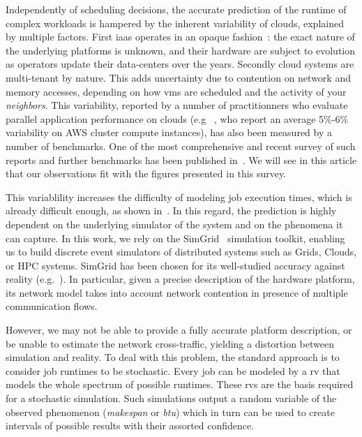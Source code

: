 \documentclass[10pt,conference,compsocconf]{IEEEtran}
\begin{document}
Independently of scheduling decisions, the accurate prediction of the runtime of
complex workloads is  hampered by the inherent variability  of clouds, explained
by multiple factors.  First \ac{iaas} operates  in an opaque fashion~: the exact
nature of the underlying platforms is unknown, and their hardware are subject to
evolution as operators update their data-centers over the years.  Secondly cloud
systems are multi-tenant  by nature. This adds uncertainty due  to contention on
network and  memory accesses, depending  on how  \acp{vm} are scheduled  and the
activity of  your \emph{neighbors}.  This  variability, reported by a  number of
practitionners  who evaluate  parallel  application performance  on clouds  (e.g
~\cite{MehrotraDHHJLSB16},  who report  an  average 5\%-6\%  variability on  AWS
cluster   compute  instances),   has  also   been  measured   by  a   number  of
benchmarks. One of the most comprehensive  and recent survey of such reports and
further benchmarks has been published in~\cite{LeitnerC16}. We will see in this 
article that our observations fit with the figures presented in this survey. 

This  variablility increases  the difficulty  of modeling  job execution  times,
which is  already difficult  enough, as  shown in~\cite{Lastovetsky05}.  In this
regard, the  prediction is highly dependent  on the underlying simulator  of the
system  and on  the phenomena  it can  capture.  In this  work, we  rely on  the
SimGrid~\cite{simgrid} simulation  toolkit, enabling us to  build discrete event
simulators of distributed systems such as Grids, Clouds, or HPC systems. SimGrid
has   been    chosen   for    its   well-studied   accuracy    against   reality
(e.g.~\cite{StanisicTLVM15,VelhoSCL13}).    In  particular,   given  a   precise
description  of the  hardware platform,  its  network model  takes into  account
network contention in presence of multiple communication flows.

However, we may not be able to provide a fully accurate platform description, or
be unable  to estimate  the network  cross-traffic, yielding  a distortion  between
simulation and reality.  To deal with this problem, the  standard approach is to
consider job runtimes to  be stochastic.  Every job can be  modeled by a \ac{rv}
that models the whole spectrum of possible runtimes. These \acp{rv} are the basis
required for a stochastic simulation.  Such simulations output a random variable
of the  observed phenomenon (\emph{makespan}  or \emph{\ac{btu}}) which  in turn
can  be  used to  create  intervals  of  possible  results with  their  assorted
confidence.
\end{document}
